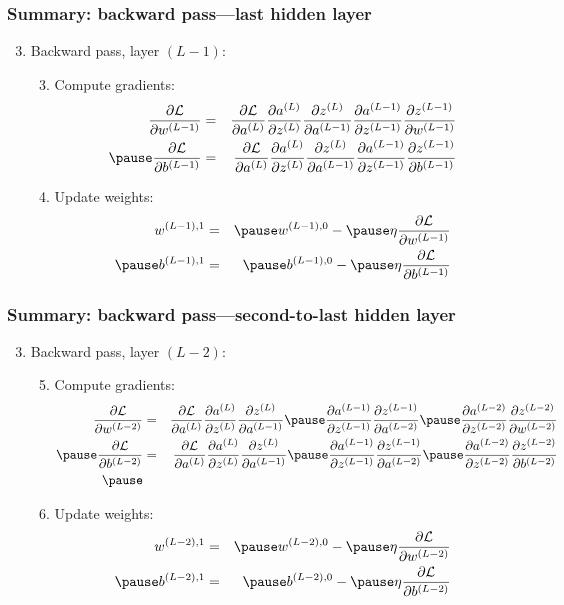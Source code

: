 \documentclass[smaller]{beamer}
\begin{document}
\begin{frame}
  \frametitle{Summary: backward pass---last hidden layer}
  \begin{enumerate}[<+->]\setcounter{enumi}{2}
  \item Backward pass, layer $(L-1)$:\pause
    \begin{enumerate}[<+->]\setcounter{enumii}{2}
    \item Compute gradients: \pause
    \begin{eqnarray}
      \pd{\mc{L}}{w^{(L-1)}} &=&  \pd{\mc{L}}{a^{(L)}}\pd{a^{(L)}}{z^{(L)}}\pd{z^{(L)}}{a^{(L-1)}}  \pd{a^{(L-1)}}{z^{(L-1)}}\pd{z^{(L-1)}}{w^{(L-1)}}\\\pause
      \pd{\mc{L}}{b^{(L-1)}} &=&   \pd{\mc{L}}{a^{(L)}}\pd{a^{(L)}}{z^{(L)}}\pd{z^{(L)}}{a^{(L-1)}} \pd{a^{(L-1)}}{z^{(L-1)}}\pd{z^{(L-1)}}{b^{(L-1)}}
    \end{eqnarray}
    \pause
  \item Update weights: \pause
    \begin{eqnarray}
      w^{(L-1), 1}  &=& \pause  w^{(L-1),0} - \pause \eta \pd{\mc{L}}{w^{(L-1)}}  \\\pause
      b^{(L-1), 1}  &=&  \pause b^{(L-1),0} - \pause \eta \pd{\mc{L}}{b^{(L-1)}}  
    \end{eqnarray}
  \end{enumerate}
  \end{enumerate}
\end{frame}

\begin{frame}
  \frametitle{Summary: backward pass---second-to-last hidden layer}
  \begin{enumerate}[<+->]\setcounter{enumi}{2}
  \item Backward pass, layer $(L-2)$:\pause
    \begin{enumerate}[<+->] \setcounter{enumii}{4}
    \item Compute gradients: \pause
    \begin{eqnarray}
      \pd{\mc{L}}{w^{(L-2)}} &=&  \pd{\mc{L}}{a^{(L)}}\pd{a^{(L)}}{z^{(L)}}\pd{z^{(L)}}{a^{(L-1)}} \pause
                        \pd{a^{(L-1)}}{z^{(L-1)}}\pd{z^{(L-1)}}{a^{(L-2)}} \pause
                        \pd{a^{(L-2)}}{z^{(L-2)}}\pd{z^{(L-2)}}{w^{(L-2)}}\\\pause
      \pd{\mc{L}}{b^{(L-2)}} &=&   \pd{\mc{L}}{a^{(L)}}\pd{a^{(L)}}{z^{(L)}}\pd{z^{(L)}}{a^{(L-1)}} \pause
                        \pd{a^{(L-1)}}{z^{(L-1)}}\pd{z^{(L-1)}}{a^{(L-2)}} \pause
                        \pd{a^{(L-2)}}{z^{(L-2)}}\pd{z^{(L-2)}}{b^{(L-2)}}\\\pause
    \end{eqnarray}
    \pause
  \item Update weights: \pause
    \begin{eqnarray}
      w^{(L-2), 1}  &=& \pause  w^{(L-2),0} - \pause \eta \pd{\mc{L}}{w^{(L-2)}}  \\\pause
      b^{(L-2), 1}  &=&  \pause b^{(L-2),0} - \pause \eta \pd{\mc{L}}{b^{(L-2)}}  
    \end{eqnarray}
  \end{enumerate}
  \end{enumerate}
\end{frame}
\end{document}
